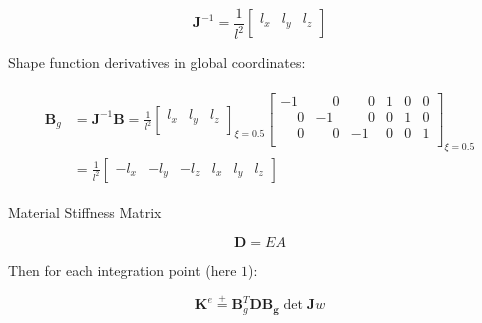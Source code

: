 \documentclass[10pt,b5paper,titlepage]{book}
\newcommand{\m}{\mathbf}
\newcommand*\eqp{\stackrel{+}{=}}
\newenvironment{eqarray}
{
    \begin{eqnarray}
        \begin{aligned}
}
{
        \end{aligned}
    \end{eqnarray}
}
\begin{document}
\begin{equation}
    \m{J}^{-1} = \frac{1}{l^2}
    \begin{bmatrix}
        l_x & l_y & l_z \\
    \end{bmatrix}
\end{equation}

Shape function derivatives in global coordinates:

\begin{eqarray}
    \m{B}_g
    &= \m{J}^{-1} \m{B}
    = \frac{1}{l^2}
    \begin{bmatrix}
        l_x & l_y & l_z \\
    \end{bmatrix}_{\xi = 0.5}
    \begin{bmatrix}
        -1 & \phantom{-}0 & \phantom{-}0 & 1 & 0 & 0 \\
        \phantom{-}0 & -1 & \phantom{-}0 & 0 & 1 & 0  \\
        \phantom{-}0 & \phantom{-}0 & -1 & 0 & 0 & 1  \\
    \end{bmatrix}_{\xi = 0.5} \\
    &= \frac{1}{l^2}
    \begin{bmatrix}
        -l_x & -l_y & -l_z & l_x & l_y & l_z
    \end{bmatrix}
\end{eqarray}

Material Stiffness Matrix

\begin{equation}
    \m{D} = EA
\end{equation}

Then for each integration point (here $1$):

\begin{equation}
    \m{K}^e \eqp \m{B}_g^T \m{D} \m{B_g} \det \m{J} w
\end{equation}
\end{document}
